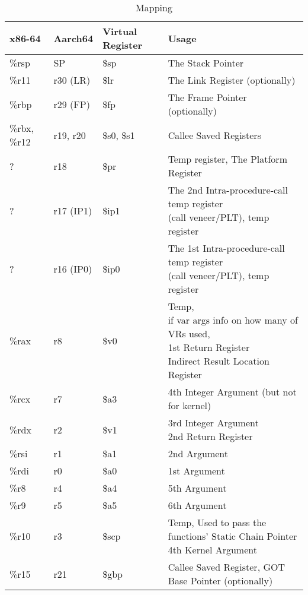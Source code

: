 \documentclass[11pt]{article}
\begin{document}
\begin{table}[ht]
\caption{Mapping}
\begin{adjustwidth}{-3cm}{-3cm}
\begin{tabular}{|l|l|l|l|}
    \hline
    \textbf{x86-64} & \textbf{Aarch64} & \textbf{Virtual Register} & \textbf{Usage} \\
    \hline
    \%rsp & SP & \$sp & The Stack Pointer \\
    \hline
    \%r11 & r30 (LR) & \$lr & The Link Register (optionally) \\
    \hline
    \%rbp & r29 (FP) & \$fp & The Frame Pointer (optionally) \\
    \hline
    \%rbx, \%r12 & r19, r20 & \$s0, \$s1 & Callee Saved Registers \\
    \hline
    ? & r18 & \$pr & Temp register, The Platform Register \\
    \hline
    ? & r17 (IP1) & \$ip1 & \pbox{20cm}{The 2nd Intra-procedure-call temp register \\ (call veneer/PLT), temp register} \\
    \hline
    ? & r16 (IP0) & \$ip0 & \pbox{20cm}{The 1st Intra-procedure-call temp register \\ (call veneer/PLT), temp register} \\
    \hline
    \%rax & r8 & \$v0 & \pbox{20cm}{Temp, \\  if var args info on how many of VRs used, \\ 1st Return Register \\ Indirect Result Location Register} \\
    \hline
    \%rcx & r7 & \$a3 & 4th Integer Argument (but not for kernel) \\
    \hline
    \%rdx & r2 & \$v1 & \pbox{20cm}{3rd Integer Argument \\ 2nd Return Register} \\
    \hline
    \%rsi & r1 & \$a1 & 2nd Argument \\
    \hline
    \%rdi & r0 & \$a0 & 1st Argument \\
    \hline
    \%r8 & r4 & \$a4 & 5th Argument \\
    \hline
    \%r9 & r5 & \$a5 & 6th Argument \\
    \hline
    \%r10 & r3 & \$scp & \pbox{20cm}{Temp, Used to pass the functions' Static Chain Pointer \\ 4th Kernel Argument} \\
    \hline
    \%r15 & r21 & \$gbp & Callee Saved Register, GOT Base Pointer (optionally) \\
    \hline
\end{tabular}
\end{adjustwidth}\label{tab:mappings}
\end{table}
\end{document}
